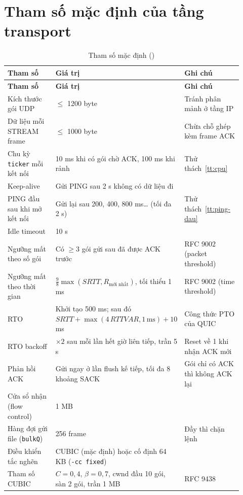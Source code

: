 \section{Tham số mặc định của tầng transport}
\label{app:tham-so}

\begin{longtable}{L{0.25\linewidth} L{0.4\linewidth} L{0.27\linewidth}}
  \caption{Tham số mặc định ()}\label{tab:tham-so} \\
  \toprule
  \textbf{Tham số} & \textbf{Giá trị} & \textbf{Ghi chú} \\
  \midrule
  \endfirsthead
  \toprule
  \textbf{Tham số} & \textbf{Giá trị} & \textbf{Ghi chú} \\
  \midrule
  \endhead
  Kích thước gói UDP & $\le$ 1200 byte & Tránh phân mảnh ở tầng IP \cite{rfc9000} \\
  Dữ liệu mỗi STREAM frame & $\le$ 1000 byte & Chừa chỗ ghép kèm frame ACK \\
  Chu kỳ \texttt{ticker} mỗi kết nối & 10 ms khi có gói chờ ACK, 100 ms khi rảnh & Thử thách~\ref{tt:cpu} \\
  Keep-alive & Gửi PING sau 2 s không có dữ liệu đi & \\
  PING đầu sau khi mở kết nối & Gửi lại sau 200, 400, 800 ms\dots{} (tối đa 2 s) & Thử thách~\ref{tt:ping-dau} \\
  Idle timeout & 10 s & \\
  Ngưỡng mất theo số gói & Có $\ge 3$ gói gửi sau đã được ACK trước & RFC 9002 (packet threshold) \cite{rfc9002} \\
  Ngưỡng mất theo thời gian & $\frac98 \max(\mathit{SRTT}, R_\text{mới nhất})$, tối thiểu 1 ms & RFC 9002 (time threshold) \cite{rfc9002} \\
  RTO & Khởi tạo 500 ms; sau đó $\mathit{SRTT} + \max(4\,\mathit{RTTVAR}, 1\,\text{ms}) + 10$ ms
  & Công thức PTO của QUIC \cite{rfc9002} \\
  RTO backoff & $\times 2$ sau mỗi lần hết giờ liên tiếp, trần 5 s & Reset về 1 khi nhận ACK mới \\
  Phản hồi ACK & Gửi ngay ở lần flush kế tiếp, tối đa 8 khoảng SACK & Gói chỉ có ACK thì không ACK lại \\
  Cửa sổ nhận (flow control) & 1 MB & \\
  Hàng đợi gửi file (\texttt{bulkQ}) & 256 frame & Đầy thì chặn lệnh  \\
  Điều khiển tắc nghẽn & CUBIC (mặc định) hoặc cố định 64 KB (\texttt{-cc fixed}) & \\
  Tham số CUBIC & $C = 0{,}4$, $\beta = 0{,}7$, cwnd đầu 10 gói, sàn 2 gói, trần 1 MB & RFC 9438 \cite{rfc9438} \\
  \bottomrule
\end{longtable}
